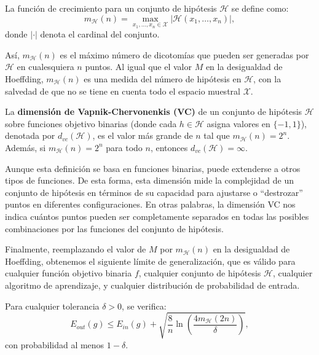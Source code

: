 \begin{definicion}
    La función de crecimiento para un conjunto de hipótesis $\mathcal{H}$ se define como:
    \[
        m_{\mathcal{H}}(n) = \max_{x_1, \ldots, x_n \in \mathcal{X}} |\mathcal{H}(x_1, \ldots, x_n)|,
    \]
    donde $|\cdot|$ denota el cardinal del conjunto.
\end{definicion}

Así, $m_{\mathcal{H}}(n)$ es el máximo número de dicotomías que pueden ser generadas por $\mathcal{H}$ en cualesquiera $n$ puntos. Al igual que el valor $M$ en la desigualdad de Hoeffding, $m_{\mathcal{H}}(n)$ es una medida del número de hipótesis en $\mathcal{H}$, con la salvedad de que no se tiene en cuenta todo el espacio muestral $\mathcal{X}$.

\begin{definicion}[Dimensión VC]
    La \textbf{dimensión de Vapnik-Chervonenkis (VC)} de un conjunto de hipótesis $\mathcal{H}$ sobre funciones objetivo binarias (donde cada $h \in \mathcal{H}$ asigna valores en $\{-1, 1\}$), denotada por $d_{vc}(\mathcal{H})$, es el valor más grande de $n$ tal que $m_{\mathcal{H}}(n) = 2^n$. Además, si $m_{\mathcal{H}}(n) = 2^n$ para todo $n$, entonces $d_{vc}(\mathcal{H}) = \infty$.
\end{definicion}

Aunque esta definición se basa en funciones binarias, puede extenderse a otros tipos de funciones. De esta forma, esta dimensión mide la complejidad de un conjunto de hipótesis en términos de su capacidad para ajustarse o ``destrozar'' puntos en diferentes configuraciones. En otras palabras, la dimensión VC nos indica cuántos puntos pueden ser completamente separados en todas las posibles combinaciones por las funciones del conjunto de hipótesis.

Finalmente, reemplazando el valor de $M $ por $m_{\mathcal{H}}(n)$ en la desigualdad de Hoeffding, obtenemos el siguiente límite de generalización, que es válido para cualquier función objetivo binaria $f$, cualquier conjunto de hipótesis $\mathcal{H}$, cualquier algoritmo de aprendizaje, y cualquier distribución de probabilidad de entrada.

\begin{teorema}\label{teo:limite-VC}
    Para cualquier tolerancia $ \delta > 0 $, se verifica:
    \[
        E_{out}(g) \leq E_{in}(g) + \sqrt{\frac{8}{n} \ln \left( \frac{4 m_{\mathcal{H}}(2n)}{\delta} \right) },
    \]
    con probabilidad al menos $ 1 - \delta $.
\end{teorema}

